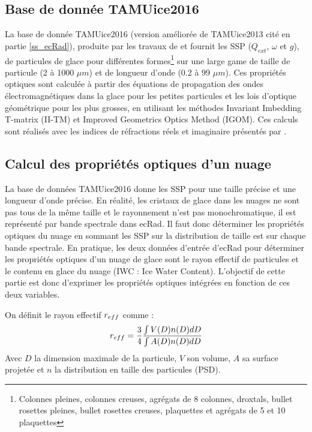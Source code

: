 \subsection{Base de donnée TAMUice2016}
\label{ss_bdd}

La base de donnée TAMUice2016 (version améliorée de TAMUice2013 cité en partie \ref{ss_ecRad}), produite par les travaux de \cite{yang_spectrally_2013} et \cite{bi_improved_2017} fournit les SSP ($Q_{ext}$, $\omega$ et $g$), de particules de glace pour différentes formes\footnote{Colonnes pleines, colonnes creuses, agrégats de 8 colonnes, droxtals, bullet rosettes pleines, bullet
rosettes creuses, plaquettes et agrégats de 5 et 10 plaquettes} sur une large game de taille de particule (2 à 1000 $\mu m$) et de longueur d'onde (0.2 à 99 $\mu m$). Ces propriétés optiques sont calculée à partir des équations de propagation des ondes électromagnétiques dans la glace pour les petites particules et les lois d'optique géométrique pour les plus grosses, en utilisant les méthodes Invariant Imbedding T-matrix (II-TM) et Improved Geometrics Optics Method (IGOM). Ces calculs sont réalisés avec les indices de réfractions réels et imaginaire présentés par \cite{warren_optical_2008}.


\subsection{Calcul des propriétés optiques d'un nuage}

La base de données TAMUice2016 donne les SSP pour une taille précise et une longueur d'onde précise. En réalité, les cristaux de glace dans les nuages ne sont pas tous de la même taille et le rayonnement n'est pas monochromatique, il est représenté par bande spectrale dans ecRad. Il faut donc déterminer les propriétés optiques du nuage en sommant les SSP sur la distribution de taille est sur chaque bande spectrale. En pratique, les deux données d'entrée d'ecRad pour déterminer les propriétés optiques d'un nuage de glace sont le rayon effectif de particules et le contenu en glace du nuage (IWC : Ice Water Content). L'objectif de cette partie est donc d'exprimer les propriétés optiques intégrées en fonction de ces deux variables.

On définit le rayon effectif $r_{eff}$ comme : 
\begin{equation}
    r_{eff} = \frac{3}{4}\frac{\int V(D)n(D)dD}{\int A(D)n(D)dD}
\end{equation}
Avec $D$ la dimension maximale de la particule, $V$ son volume, $A$ sa surface projetée et $n$ la distribution en taille des particules (PSD).

